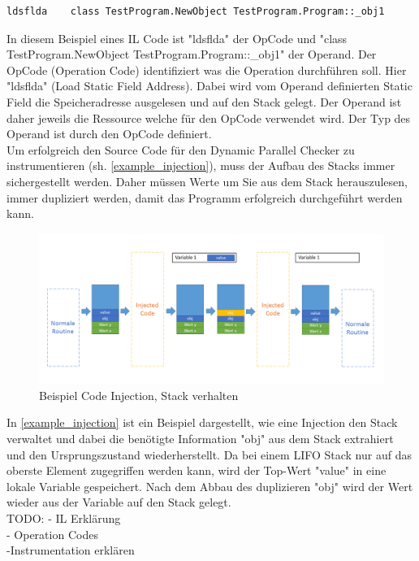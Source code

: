 \documentclass[10pt,a4paper]{article}
\begin{document}
\begin{flushleft}
\begin{lstlisting}
ldsflda    class TestProgram.NewObject TestProgram.Program::_obj1
\end{lstlisting}
In diesem Beispiel eines IL Code ist "ldsflda" der OpCode und "class TestProgram.NewObject TestProgram.Program::\_obj1" der Operand. Der OpCode (Operation Code) identifiziert was die Operation durchführen soll. Hier "ldsflda" (Load Static Field Address). Dabei wird vom Operand definierten Static Field die Speicheradresse ausgelesen und auf den Stack gelegt. Der Operand ist daher jeweils die Ressource welche für den OpCode verwendet wird. Der Typ des Operand ist durch den OpCode definiert.\\
Um erfolgreich den Source Code für den Dynamic Parallel Checker zu instrumentieren (sh. \autoref{example_injection}), muss der Aufbau des Stacks immer sichergestellt werden. Daher müssen Werte um Sie aus dem Stack herauszulesen, immer dupliziert werden, damit das Programm erfolgreich durchgeführt werden kann.\\
\begin{figure}[H]
\centering
\includegraphics[scale=0.5]{images/BeispielInjection.png}
\caption{Beispiel Code Injection, Stack verhalten}
\label{example_injection}
\end{figure}
In \autoref{example_injection} ist ein Beispiel dargestellt, wie eine Injection den Stack verwaltet und dabei die benötigte Information "obj" aus dem Stack extrahiert und den Ursprungszustand wiederherstellt. Da bei einem LIFO Stack nur auf das oberste Element zugegriffen werden kann, wird der Top-Wert "value" in eine lokale Variable gespeichert. Nach dem Abbau des duplizieren "obj" wird der Wert wieder aus der Variable auf den Stack gelegt.\\
TODO:
- IL Erklärung\\
- Operation Codes\\
-Instrumentation erklären
\\
\end{flushleft}
\newpage
\end{document}
